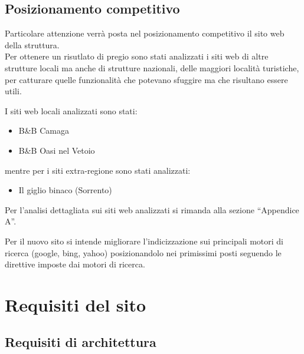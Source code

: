 \documentclass[a4paper,12pt,hidelinks]{report}
\begin{document}
\section{Posizionamento competitivo}
  Particolare attenzione verrà posta nel posizionamento competitivo il sito web della struttura.
  \\Per ottenere un risutlato di pregio sono stati analizzati i siti web di altre strutture locali ma anche di strutture nazionali, delle maggiori località turistiche, 
  per catturare quelle funzionalità che potevano sfuggire ma che risultano essere utili.
  \par I siti web locali analizzati sono stati:
  \begin{itemize}
    \item B\&B Camaga
    \item B\&B Oasi nel Vetoio
  \end{itemize}
  mentre per i siti extra-regione sono stati analizzati:
  \begin{itemize}
    \item Il giglio binaco (Sorrento)
  \end{itemize}
  Per l'analisi dettagliata sui siti web analizzati si rimanda alla sezione ``Appendice A''.
  \par Per il nuovo sito si intende migliorare l'indicizzazione sui principali motori di ricerca (google, bing, yahoo) posizionandolo nei primissimi posti 
  seguendo le direttive imposte dai motori di ricerca.

\chapter{Requisiti del sito}

\section{Requisiti di architettura}
\end{document}
